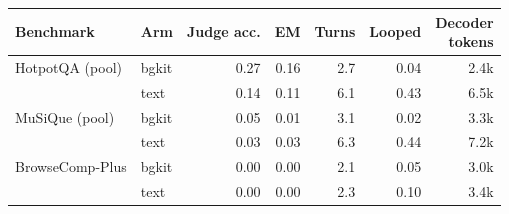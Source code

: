 \begin{tabular}{llrrrrr}
\toprule
Benchmark & Arm & Judge acc. & EM & Turns & Looped & \shortstack{Decoder\\tokens} \\
\midrule
HotpotQA (pool) & bgkit & 0.27 & 0.16 & 2.7 & 0.04 & 2.4k \\
 & text & 0.14 & 0.11 & 6.1 & 0.43 & 6.5k \\
\midrule
MuSiQue (pool) & bgkit & 0.05 & 0.01 & 3.1 & 0.02 & 3.3k \\
 & text & 0.03 & 0.03 & 6.3 & 0.44 & 7.2k \\
\midrule
BrowseComp-Plus & bgkit & 0.00 & 0.00 & 2.1 & 0.05 & 3.0k \\
 & text & 0.00 & 0.00 & 2.3 & 0.10 & 3.4k \\
\bottomrule
\end{tabular}
